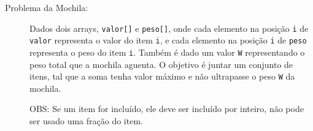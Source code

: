\documentclass[12pt]{article}
\def\code#1{\texttt{#1}}
\begin{document}
\begin{description}
\item [Problema da Mochila:]
Dados dois arrays, \code{valor[]} e \code{peso[]}, 
onde cada elemento na posição \code{i} de \code{valor} representa o valor do item \code{i}, 
e cada elemento na posição \code{i} de \code{peso} representa o peso do item \code{i}.
Também é dado um valor \code{W} representando o peso total que a mochila aguenta.
O objetivo é juntar um conjunto de itens,
 tal que a soma tenha valor máximo e 
não ultrapasse o peso \code{W} da mochila.

OBS: Se um item for incluído, ele deve ser incluído por inteiro, não pode ser 
usado uma fração do item.



\end{description}
\end{document}
